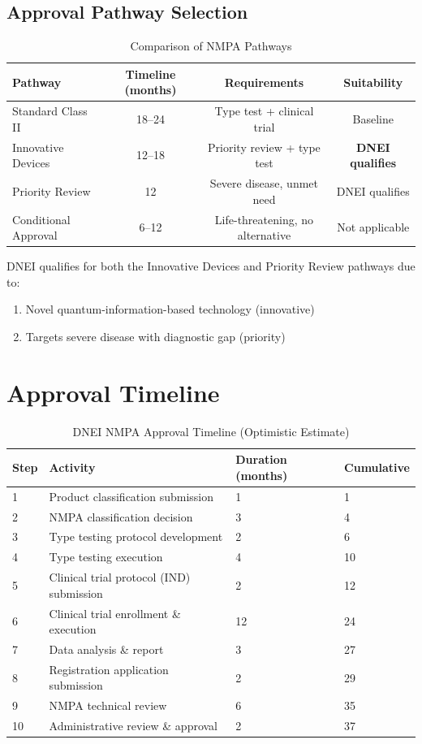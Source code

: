 \documentclass[12pt]{article}
\begin{document}
\subsection{Approval Pathway Selection}

\begin{table}[ht]
\centering
\caption{Comparison of NMPA Pathways}
\label{tab:paths}
\begin{tabular}{lccc}
\toprule
Pathway & Timeline (months) & Requirements & Suitability \\
\midrule
Standard Class II & 18--24 & Type test + clinical trial & Baseline \\
Innovative Devices & 12--18 & Priority review + type test & \textbf{DNEI qualifies} \\
Priority Review & 12 & Severe disease, unmet need & DNEI qualifies \\
Conditional Approval & 6--12 & Life-threatening, no alternative & Not applicable \\
\bottomrule
\end{tabular}
\end{table}

DNEI qualifies for both the Innovative Devices and Priority Review pathways due to:
\begin{enumerate}
\item Novel quantum-information-based technology (innovative)
\item Targets severe disease with diagnostic gap (priority)
\end{enumerate}

\section{Approval Timeline}
\label{sec:timeline}

\begin{table}[ht]
\centering
\caption{DNEI NMPA Approval Timeline (Optimistic Estimate)}
\label{tab:timeline}
\begin{tabular}{llll}
\toprule
Step & Activity & Duration (months) & Cumulative \\
\midrule
1 & Product classification submission & 1 & 1 \\
2 & NMPA classification decision & 3 & 4 \\
3 & Type testing protocol development & 2 & 6 \\
4 & Type testing execution & 4 & 10 \\
5 & Clinical trial protocol (IND) submission & 2 & 12 \\
6 & Clinical trial enrollment \& execution & 12 & 24 \\
7 & Data analysis \& report & 3 & 27 \\
8 & Registration application submission & 2 & 29 \\
9 & NMPA technical review & 6 & 35 \\
10 & Administrative review \& approval & 2 & 37 \\
\bottomrule
\end{tabular}
\end{table}
\end{document}
